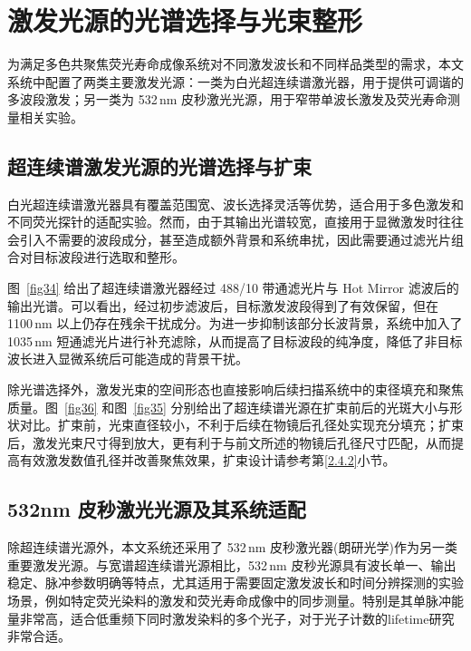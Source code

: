 \section{激发光源的光谱选择与光束整形}\label{3.2}

为满足多色共聚焦荧光寿命成像系统对不同激发波长和不同样品类型的需求，本文系统中配置了两类主要激发光源：一类为白光超连续谱激光器，用于提供可调谐的多波段激发；另一类为 532\,nm 皮秒激光光源，用于窄带单波长激发及荧光寿命测量相关实验。

\subsection{超连续谱激发光源的光谱选择与扩束}\label{3.2.1}

白光超连续谱激光器具有覆盖范围宽、波长选择灵活等优势，适合用于多色激发和不同荧光探针的适配实验。然而，由于其输出光谱较宽，直接用于显微激发时往往会引入不需要的波段成分，甚至造成额外背景和系统串扰，因此需要通过滤光片组合对目标波段进行选取和整形。

图~\ref{fig34} 给出了超连续谱激光器经过 488/10 带通滤光片与 Hot Mirror 滤波后的输出光谱。可以看出，经过初步滤波后，目标激发波段得到了有效保留，但在 1100\,nm 以上仍存在残余干扰成分。为进一步抑制该部分长波背景，系统中加入了 1035\,nm 短通滤光片进行补充滤除，从而提高了目标波段的纯净度，降低了非目标波长进入显微系统后可能造成的背景干扰。

除光谱选择外，激发光束的空间形态也直接影响后续扫描系统中的束径填充和聚焦质量。图~\ref{fig36} 和图~\ref{fig35} 分别给出了超连续谱光源在扩束前后的光斑大小与形状对比。扩束前，光束直径较小，不利于后续在物镜后孔径处实现充分填充；扩束后，激发光束尺寸得到放大，更有利于与前文所述的物镜后孔径尺寸匹配，从而提高有效激发数值孔径并改善聚焦效果，扩束设计请参考第\ref{2.4.2}小节。



\subsection{532nm 皮秒激光光源及其系统适配}\label{3.2.2}

除超连续谱光源外，本文系统还采用了 532\,nm 皮秒激光器(朗研光学)作为另一类重要激发光源。与宽谱超连续谱光源相比，532\,nm 皮秒光源具有波长单一、输出稳定、脉冲参数明确等特点，尤其适用于需要固定激发波长和时间分辨探测的实验场景，例如特定荧光染料的激发和荧光寿命成像中的同步测量。特别是其单脉冲能量非常高，适合低重频下同时激发染料的多个光子，对于光子计数的lifetime研究非常合适。


